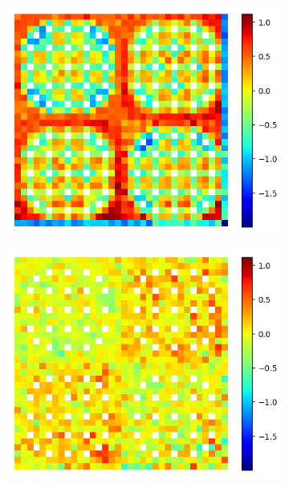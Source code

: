 \begin{figure}[H]
  \centering 
\begin{subfigure}{0.45\textwidth}
  \centering
  \includegraphics[width=\linewidth]{figures/reflector/capt-null-errors}
  \caption{}
  \label{fig:reflector-capt-null-error}
\end{subfigure}
\begin{subfigure}{0.45\textwidth}
  \centering
  \includegraphics[width=\linewidth]{figures/reflector/capt-degenerate-errors}
  \caption{}
  \label{fig:reflector-capt-degen-error}
\end{subfigure}

\end{figure}
